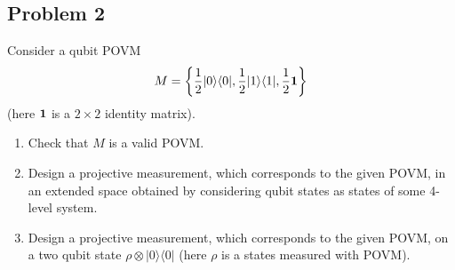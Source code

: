 \documentclass[a4paper,10pt]{article}
\newcommand{\ket}[1]{|#1\rangle}
\newcommand{\bra}[1]{\langle#1|}
\begin{document}
\subsection*{Problem 2}
Consider a qubit POVM
\begin{equation}
	M = \left\{\frac{1}{2}\ket{0}\bra{0}, \frac{1}{2}\ket{1}\bra{1}, \frac{1}{2}{\bf 1}\right\}
\end{equation}
(here ${\bf 1}$ is a $2\times 2$ identity matrix).
\begin{enumerate}
	\item Check that $M$ is a valid POVM.
	\item Design a projective measurement, which corresponds to the given POVM, in an extended space obtained by considering qubit states as states of some 4-level system. 
	\item Design a projective measurement, which corresponds to the given POVM, on a two qubit state $\rho\otimes\ket{0}\bra{0}$ (here $\rho$ is a states measured with POVM).
\end{enumerate}
\end{document}
